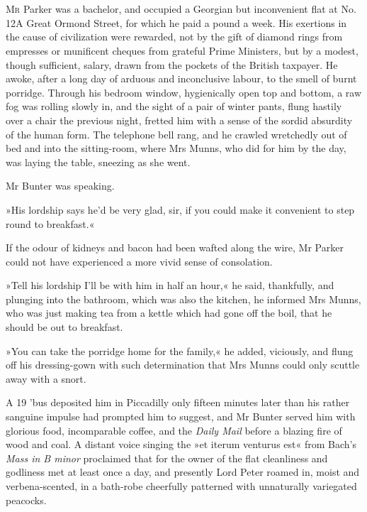 \chapter[Chapter \thechapter]{}
\lettrine[lines=4]{M}{r} Parker was a bachelor, and occupied a Georgian but inconvenient flat at No. 12A Great Ormond Street, for which he paid a pound a week. His exertions in the cause of civilization were rewarded, not by the gift of diamond rings from empresses or munificent cheques from grateful Prime Ministers, but by a modest, though sufficient, salary, drawn from the pockets of the British taxpayer. He awoke, after a long day of arduous and inconclusive labour, to the smell of burnt porridge. Through his bedroom window, hygienically open top and bottom, a raw fog was rolling slowly in, and the sight of a pair of winter pants, flung hastily over a chair the previous night, fretted him with a sense of the sordid absurdity of the human form. The telephone bell rang, and he crawled wretchedly out of bed and into the sitting-room, where Mrs Munns, who did for him by the day, was laying the table, sneezing as she went.

Mr Bunter was speaking.

»His lordship says he'd be very glad, sir, if you could make it convenient to step round to breakfast.«

If the odour of kidneys and bacon had been wafted along the wire, Mr Parker could not have experienced a more vivid sense of consolation.

»Tell his lordship I'll be with him in half an hour,« he said, thankfully, and plunging into the bathroom, which was also the kitchen, he informed Mrs Munns, who was just making tea from a kettle which had gone off the boil, that he should be out to breakfast.

»You can take the porridge home for the family,« he added, viciously, and flung off his dressing-gown with such determination that Mrs Munns could only scuttle away with a snort.

A 19 'bus deposited him in Piccadilly only fifteen minutes later than his rather sanguine impulse had prompted him to suggest, and Mr Bunter served him with glorious food, incomparable coffee, and the \textit{Daily Mail} before a blazing fire of wood and coal. A distant voice singing the »et iterum venturus est« from Bach's \textit{Mass in B minor} proclaimed that for the owner of the flat cleanliness and godliness met at least once a day, and presently Lord Peter roamed in, moist and verbena-scented, in a bath-robe cheerfully patterned with unnaturally variegated peacocks.

